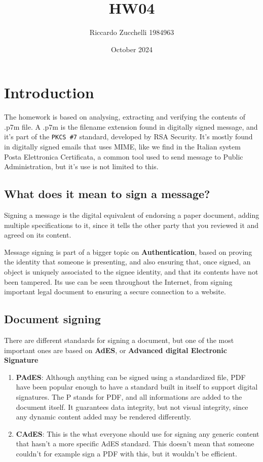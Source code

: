 \documentclass{article}
\title{HW04}
\author{Riccardo Zucchelli 1984963}
\date{October 2024}
\begin{document}
\maketitle

\section{Introduction}
The homework is based on analysing, extracting and verifying the contents of .p7m file.
A .p7m is the filename extension found in digitally signed message, and it's part of the \texttt{PKCS \#7} standard, developed by RSA Security.
It's mostly found in digitally signed emails that uses MIME, like we find in the Italian system Posta Elettronica Certificata, a common tool used to send message to Public Administration, but it's use is not limited to this. 
\subsection{What does it mean to sign a message?}
Signing a message is the digital equivalent of endorsing a paper document, adding multiple specifications to it, since it tells the other party that you reviewed it and agreed on its content.

Message signing is part of a bigger topic on \textbf{Authentication}, based on proving the identity that someone is presenting, and also ensuring that, once signed, an object is uniquely associated to the signee identity, and that its contents have not been tampered. Its use can be seen throughout the Internet, from signing important legal document to ensuring a secure connection to a website.

\subsection{Document signing}
There are different standards for signing a document, but one of the most important ones are based on  \textbf{AdES}, or \textbf{Advanced digital Electronic Signature}
\begin{enumerate}
    \item \textbf{PAdES}: Although anything can be signed using a standardized file, PDF have been popular enough to have a standard built in itself to support digital signatures. The P stands for PDF, and all informations are added to the document itself. It guarantees data integrity, but not visual integrity, since any dynamic content added may be rendered differently.
    \item \textbf{CAdES}: This is the what everyone should use for signing any generic content that hasn't a more specific AdES standard. This doesn't mean that someone couldn't for example sign a PDF with this, but it wouldn't be efficient.
\end{enumerate}
\end{document}
